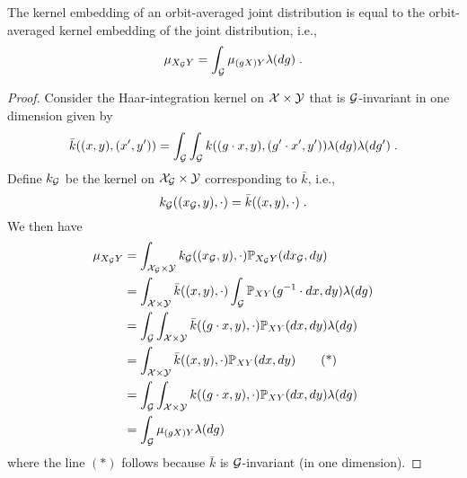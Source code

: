 \begin{proposition} \label{prop:embed}
The kernel embedding of an orbit-averaged joint distribution is equal to the orbit-averaged kernel embedding of the joint distribution, i.e.,
\[
\mu_{X_{\mathcal{G}} Y} = \int_{\mathcal{G}} \mu_{(gX)Y}\lambda(dg)\;.
\]
\end{proposition}
\begin{proof}
Consider the Haar-integration kernel \parencite{Haasdonk:2005} on $\mathcal{X}\times\mathcal{Y}$ that is $\mathcal{G}$-invariant in one dimension given by
\[
\bar{k}((x,y),(x',y'))=\int_{\mathcal{G}}\int_{\mathcal{G}} k((g\cdot x,y), (g'\cdot x',y'))\lambda(dg)\lambda(dg')\;.
\]
Define $k_{\mathcal{G}}$ be the kernel on $\mathcal{X}_{\mathcal{G}}\times\mathcal{Y}$ corresponding to $\bar{k}$, i.e.,
\[
k_{\mathcal{G}}((x_{\mathcal{G}},y),\cdot) = \bar{k}((x,y),\cdot) \;.
\]
We then have
\begin{align*}
\mu_{X_{\mathcal{G}} Y} &= \int_{\mathcal{X}_{\mathcal{G}}\times\mathcal{Y}}k_{\mathcal{G}}((x_{\mathcal{G}}, y),\cdot)\mathbb{P}_{X_{\mathcal{G}} Y}(dx_{\mathcal{G}},dy) \\
&= \int_{\mathcal{X}\times\mathcal{Y}}\bar{k}((x,y),\cdot)\int_{\mathcal{G}}\mathbb{P}_{XY}(g^{-1}\cdot dx,dy)\lambda(dg) \\
&= \int_{\mathcal{G}}\int_{\mathcal{X}\times\mathcal{Y}}\bar{k}((g\cdot x, y),\cdot)\mathbb{P}_{XY}(dx,dy)\lambda(dg) \\
&= \int_{\mathcal{X}\times\mathcal{Y}}\bar{k}((x,y),\cdot)\mathbb{P}_{XY}(dx,dy) \tag{*} \\
&= \int_{\mathcal{G}}\int_{\mathcal{X}\times\mathcal{Y}}k((g\cdot x, y),\cdot)\mathbb{P}_{XY}(dx,dy)\lambda(dg) \\
&= \int_{\mathcal{G}}\mu_{(gX)Y}\lambda(dg)
\end{align*}
where the line $(*)$ follows because $\bar{k}$ is $\mathcal{G}$-invariant (in one dimension).
\end{proof}

